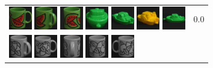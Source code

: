 \begin{figure}[tbp]
\begin{center}
\begin{tabular}{m{11cm} | m{3cm} |}
\includegraphics[width=1cm]{coil/beeld-30.eps}
\includegraphics[width=1cm]{coil/beeld-34.eps}
\includegraphics[width=1cm]{coil/beeld-32.eps}
\includegraphics[width=1cm]{coil/beeld-56.eps}
\includegraphics[width=1cm]{coil/beeld-58.eps}
\includegraphics[width=1cm]{coil/beeld-16.eps}
\includegraphics[width=1cm]{coil/beeld-54.eps}
& {\scriptsize 0.0}
\\
\includegraphics[width=1cm]{coil/beeld-49.eps}
\includegraphics[width=1cm]{coil/beeld-48.eps}
\includegraphics[width=1cm]{coil/beeld-50.eps}
\includegraphics[width=1cm]{coil/beeld-52.eps}
\includegraphics[width=1cm]{coil/beeld-51.eps}

\end{tabular}
\end{center}
\end{figure}
